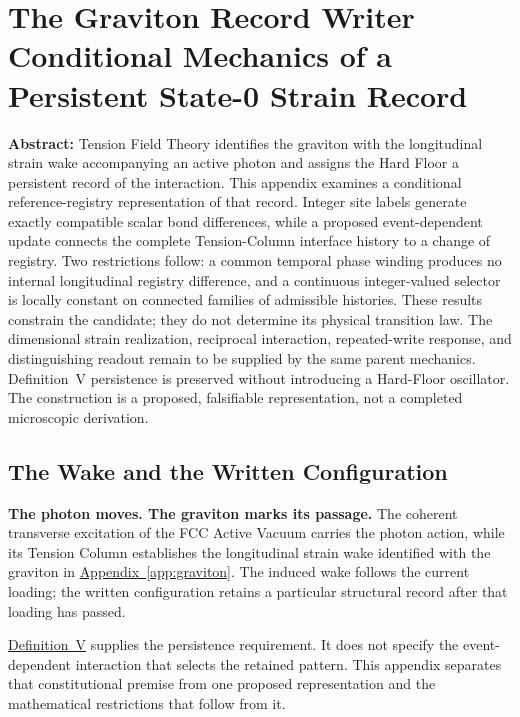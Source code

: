 \chapter[Conditional Mechanics of the Graviton Record]{The Graviton Record Writer\\[0.2cm] \large Conditional Mechanics of a Persistent State-0 Strain Record}
\label{app:state0_record_writer}

\noindent\textbf{Abstract:}
Tension Field Theory identifies the graviton with the longitudinal strain wake accompanying an active photon and assigns the Hard Floor a persistent record of the interaction. This appendix examines a conditional reference-registry representation of that record. Integer site labels generate exactly compatible scalar bond differences, while a proposed event-dependent update connects the complete Tension-Column interface history to a change of registry. Two restrictions follow: a common temporal phase winding produces no internal longitudinal registry difference, and a continuous integer-valued selector is locally constant on connected families of admissible histories. These results constrain the candidate; they do not determine its physical transition law. The dimensional strain realization, reciprocal interaction, repeated-write response, and distinguishing readout remain to be supplied by the same parent mechanics. Definition~V persistence is preserved without introducing a Hard-Floor oscillator. The construction is a proposed, falsifiable representation, not a completed microscopic derivation.

\section{The Wake and the Written Configuration}
\label{sec:AW_wake_and_record}

\noindent\textbf{The photon moves. The graviton marks its passage.}
The coherent transverse excitation of the FCC Active Vacuum carries the photon action, while its Tension Column establishes the longitudinal strain wake identified with the graviton in \hyperref[app:graviton]{Appendix~\ref*{app:graviton}}. The induced wake follows the current loading; the written configuration retains a particular structural record after that loading has passed.

\hyperref[def:definition_five]{Definition~V} supplies the persistence requirement. It does not specify the event-dependent interaction that selects the retained pattern. This appendix separates that constitutional premise from one proposed representation and the mathematical restrictions that follow from it.

